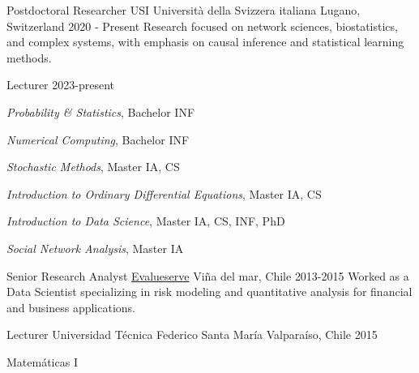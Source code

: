

\begin{cventries}

\cventry
    {Postdoctoral Researcher}
    {USI Università della Svizzera italiana} %
    {Lugano, Switzerland} %
    {2020 - Present} %
    {
      Research focused on network sciences, biostatistics, and complex systems, with emphasis on causal inference and statistical learning methods.
    }

\cventry
    {Lecturer} %
    { } %
    {} %
    {2023-present} %
{
  \begin{cvitems} %
    \item {\emph{Probability \& Statistics}, Bachelor INF}
    \item {\emph{Numerical Computing}, Bachelor INF}
    \item {\emph{Stochastic Methods}, Master IA, CS}
    \item {\emph{Introduction to Ordinary Differential Equations}, Master IA, CS}
    \item {\emph{Introduction to Data Science}, Master IA, CS, INF, PhD}
    \item {\emph{Social Network Analysis}, Master IA}
  \end{cvitems}
}



\cventry
{Senior Research Analyst} %
{\href{www.evalueserve.com}{Evalueserve}} %
{Vi\~na del mar, Chile} %
{2013-2015} %
{
	Worked as a Data Scientist specializing in risk modeling and quantitative analysis for financial and business applications.
}

  \cventry
    {Lecturer} %
    {Universidad T\'ecnica Federico Santa Mar\'ia } %
    {Valpara\'iso, Chile} %
    {2015} %
    {
      \begin{cvitems} %
        \item {Matem\'aticas I}
      \end{cvitems}
    }


\end{cventries}
